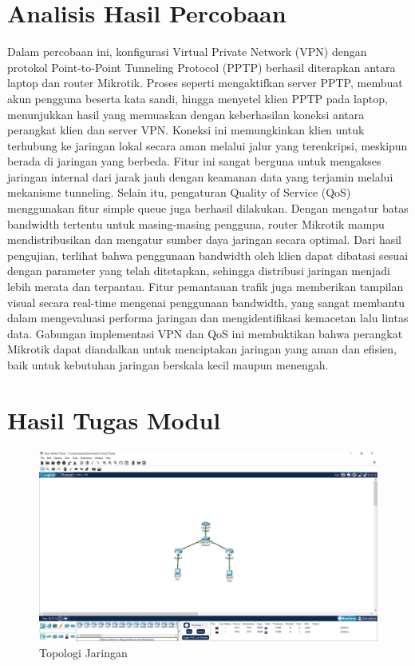 \section{Analisis Hasil Percobaan}

Dalam percobaan ini, konfigurasi Virtual Private Network (VPN) dengan protokol Point-to-Point Tunneling Protocol (PPTP) berhasil diterapkan antara laptop dan router Mikrotik. Proses seperti mengaktifkan server PPTP, membuat akun pengguna beserta kata sandi, hingga menyetel klien PPTP pada laptop, menunjukkan hasil yang memuaskan dengan keberhasilan koneksi antara perangkat klien dan server VPN. Koneksi ini memungkinkan klien untuk terhubung ke jaringan lokal secara aman melalui jalur yang terenkripsi, meskipun berada di jaringan yang berbeda. Fitur ini sangat berguna untuk mengakses jaringan internal dari jarak jauh dengan keamanan data yang terjamin melalui mekanisme tunneling. Selain itu, pengaturan Quality of Service (QoS) menggunakan fitur simple queue juga berhasil dilakukan. Dengan mengatur batas bandwidth tertentu untuk masing-masing pengguna, router Mikrotik mampu mendistribusikan dan mengatur sumber daya jaringan secara optimal. Dari hasil pengujian, terlihat bahwa penggunaan bandwidth oleh klien dapat dibatasi sesuai dengan parameter yang telah ditetapkan, sehingga distribusi jaringan menjadi lebih merata dan terpantau. Fitur pemantauan trafik juga memberikan tampilan visual secara real-time mengenai penggunaan bandwidth, yang sangat membantu dalam mengevaluasi performa jaringan dan mengidentifikasi kemacetan lalu lintas data. Gabungan implementasi VPN dan QoS ini membuktikan bahwa perangkat Mikrotik dapat diandalkan untuk menciptakan jaringan yang aman dan efisien, baik untuk kebutuhan jaringan berskala kecil maupun menengah.

\section{Hasil Tugas Modul}

    \begin{figure}[H]
        \centering
        \includegraphics[width=0.5\linewidth]{P1/img/topologi.png}
        \caption{Topologi Jaringan}
        \label{fig:Topologi-jaringan}
    \end{figure}

